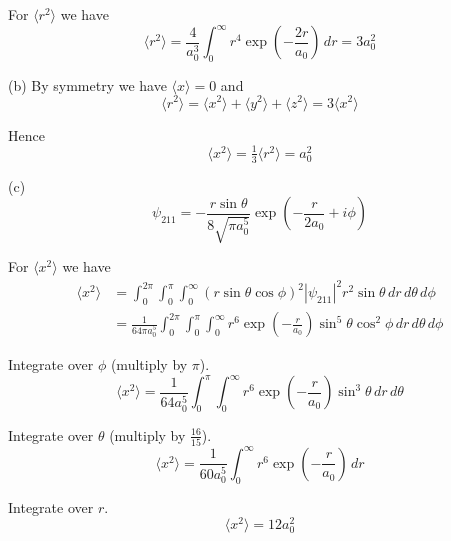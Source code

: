 For $\langle r^2\rangle$ we have
\begin{equation*}
\langle r^2\rangle=\frac{4}{a_0^3}\int_0^\infty
r^4\exp\left(-\frac{2r}{a_0}\right)\,dr=3a_0^2\tag{2}
\end{equation*}

(b) By symmetry we have $\langle x\rangle=0$ and
\begin{equation*}
\langle r^2\rangle=\langle x^2\rangle+\langle y^2\rangle+\langle z^2\rangle=3\langle x^2\rangle
\end{equation*}

Hence
\begin{equation*}
\langle x^2\rangle=\tfrac{1}{3}\langle r^2\rangle=a_0^2
\end{equation*}

(c)
\begin{equation*}
\psi_{211}=-\frac{r\sin\theta}{8\sqrt{\pi a_0^5}}\exp\left(-\frac{r}{2a_0}+i\phi\right)
\end{equation*}

For $\langle x^2\rangle$ we have
\begin{align*}
\langle x^2\rangle&=\int_0^{2\pi}\int_0^\pi\int_0^\infty
(r\sin\theta\cos\phi)^2
|\psi_{211}|^2r^2\sin\theta\,dr\,d\theta\,d\phi
\\
&=\frac{1}{64\pi a_0^5}\int_0^{2\pi}\int_0^\pi\int_0^\infty
r^6\exp\left(-\frac{r}{a_0}\right)\sin^5\theta\cos^2\phi\,dr\,d\theta\,d\phi
\end{align*}

Integrate over $\phi$ (multiply by $\pi$).
\begin{equation*}
\langle x^2\rangle=\frac{1}{64a_0^5}\int_0^\pi\int_0^\infty
r^6\exp\left(-\frac{r}{a_0}\right)\sin^3\theta\,dr\,d\theta
\end{equation*}

Integrate over $\theta$ (multiply by $\frac{16}{15}$).
\begin{equation*}
\langle x^2\rangle=\frac{1}{60a_0^5}\int_0^\infty
r^6\exp\left(-\frac{r}{a_0}\right)\,dr
\end{equation*}

Integrate over $r$.
\begin{equation*}
\langle x^2\rangle=12a_0^2
\end{equation*}



